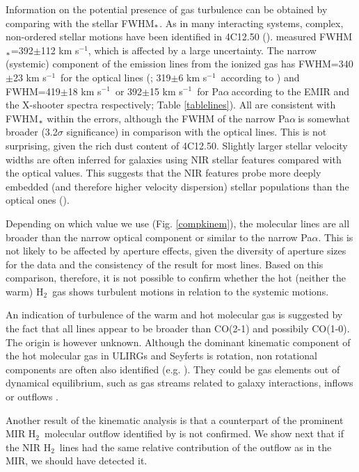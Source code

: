 \documentclass{aa}
\newcommand{\kms}{km s$^{-1}$~}
\newcommand{\pa}{Pa$\alpha~$}
\newcommand{\hmol}{H$_2$~}
\begin{document}
Information on the potential presence of gas turbulence can be obtained by comparing with the stellar FWHM$_{\rm *}$. As in many interacting systems, complex, non-ordered stellar motions have been identified in 4C12.50 (\citealt{Perna2021}). 
 \cite{Dasyra2006} measured FWHM$_{\rm *}$=392$\pm$112 km s$^{-1}$, which is affected by a large uncertainty.    The narrow (systemic) component of the  emission lines from the ionized gas  has FWHM=340$\pm$23 \kms for the optical lines (\citealt{Holt2003}; 319$\pm$6 \kms according to \citealt{Rose2018}) and  FWHM=419$\pm$18 \kms or  392$\pm$15 \kms for \pa according to the EMIR and the X-shooter spectra respectively; Table \ref{tablelines}). All are consistent with FWHM$_{\rm *}$ within the errors, although the FWHM of the narrow  \pa  is somewhat broader (3.2$\sigma$ significance) in comparison with the optical lines.  This is not surprising, given the rich dust content of 4C12.50. Slightly larger stellar velocity widths are often inferred for galaxies using  NIR stellar features compared with the optical values. This  suggests that the NIR features probe more deeply embedded (and therefore higher velocity dispersion) stellar populations than the optical ones (\citealt{Caglar2020}).


 Depending on which value we use (Fig. \ref{compkinem}),  the molecular lines are all broader than the narrow optical component or  similar to the narrow Pa$\alpha$.   This is  not likely to be affected by aperture effects, given the diversity of aperture sizes for the data and the consistency of the result for most lines.  Based on this comparison, therefore, it is not possible to confirm whether the hot (neither the warm) \hmol gas  shows turbulent motions in relation to the systemic motions. 

An indication of turbulence of the warm and hot molecular gas is suggested by the fact that all lines appear to be  broader than CO(2-1) and possibily CO(1-0). The origin is however unknown.
 Although the dominant kinematic component of the hot molecular gas in ULIRGs and Seyferts is rotation,  non rotational components are often also identified  (e.g. \citealt{Bianchin2021}).    They could be gas elements  out of dynamical equilibrium, such as gas streams related to  galaxy interactions,  inflows or outflows  \cite{Dasyra2011,Guillard2012,Fotopoulou2019}.   








Another result of the kinematic analysis is that  a counterpart of the prominent MIR \hmol molecular outflow  identified by \cite{Dasyra2011} is not confirmed. We show next that  if the NIR \hmol lines had the same relative contribution of the outflow as in the MIR,  we should have detected it.
\end{document}
